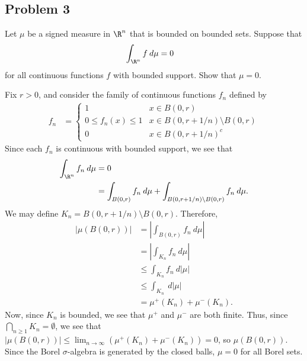 \documentclass[10pt]{mypackage}
\begin{document}
\subsection{Problem 3}%
\begin{problem}
  Let $\mu$ be a signed measure in $\R^n$ that is bounded on bounded sets. Suppose that
  \begin{align*}
    \int_{\R^n}^{} f\:d\mu &= 0
  \end{align*}
  for all continuous functions $f$ with bounded support. Show that $\mu = 0$.
\end{problem}
Fix $r > 0$, and consider the family of continuous functions $f_n$ defined by
\begin{align*}
  f_n &= \begin{cases}
    1 & x\in B\left( 0,r \right)\\
    0\leq f_n(x) \leq 1 & x\in B\left( 0,r+1/n \right)\setminus B\left( 0,r \right)\\
    0 & x\in B\left( 0,r+1/n \right)^{c}
  \end{cases}
\end{align*}
Since each $f_n$ is continuous with bounded support, we see that
\begin{align*}
  \int_{\R^n}^{} f_n\:d\mu &= 0\\
                           &= \int_{B\left( 0,r \right)}^{} f_n\:d\mu + \int_{B\left( 0,r+1/n \right)\setminus B\left( 0,r \right)}^{} f_n\:d\mu.
\end{align*}
We may define $K_n = B\left( 0,r+1/n \right)\setminus B\left( 0,r \right)$. Therefore, 
\begin{align*}
  \left\vert \mu\left( B\left( 0,r \right) \right) \right\vert &= \left\vert \int_{B\left( 0,r \right)}^{} f_n\:d\mu \right\vert\\
                                                               &= \left\vert \int_{K_n}^{} f_n\:d\mu \right\vert\\
                                                               &\leq \int_{K_n}^{} f_n\:d\left\vert \mu \right\vert\\
                                                               &\leq \int_{K_n}^{} \:d\left\vert \mu \right\vert\\
                                                               &= \mu^{+}\left( K_n \right) + \mu^{-}\left( K_n \right).
\end{align*}
Now, since $K_n$ is bounded, we see that $\mu^{+}$ and $\mu^{-}$ are both finite. Thus, since $\bigcap_{n\geq 1}K_n = \emptyset$, we see that $ \left\vert \mu\left( B\left( 0,r \right) \right) \right\vert \leq \lim_{n\rightarrow\infty} \left( \mu^{+}\left( K_n \right) + \mu^{-}\left( K_n \right) \right) = 0 $, so $\mu\left( B\left( 0,r \right) \right)$. Since the Borel $\sigma$-algebra is generated by the closed balls, $\mu = 0$ for all Borel sets.
\end{document}
